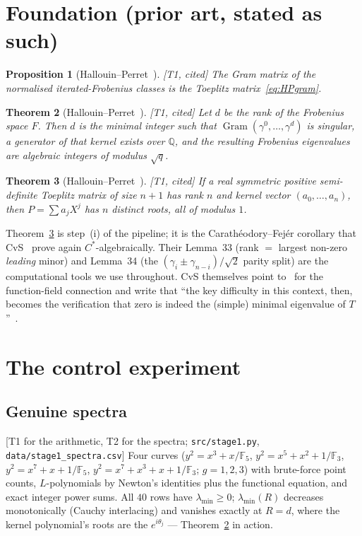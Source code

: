 \documentclass[11pt,a4paper]{article}
\newtheorem{theorem}{Theorem}
\newtheorem{proposition}[theorem]{Proposition}
\theoremstyle{definition}
\theoremstyle{remark}
\newcommand{\tier}[1]{{\small\textsf{[#1]}}}
\newcommand{\lmin}{\lambda_{\min}}
\newcommand{\src}[1]{{\footnotesize\texttt{#1}}}
\begin{document}
\section{Foundation (prior art, stated as such)}\label{sec:found}

\begin{proposition}[Hallouin--Perret~{\cite[Prop.~5, \S1.2]{HP19}}]\label{prop:HP5}
\tier{T1, cited} The Gram matrix of the normalised iterated-Frobenius classes is the
Toeplitz matrix~\eqref{eq:HPgram}.
\end{proposition}

\begin{theorem}[Hallouin--Perret~{\cite[Thm.~6, \S1.3]{HP19}}]\label{thm:HP6}
\tier{T1, cited} Let $d$ be the rank of the Frobenius space $F$. Then $d$ is the minimal
integer such that $\operatorname{Gram}(\gamma^0,\dots,\gamma^{d})$ is singular, a generator
of that kernel exists over $\mathbb{Q}$, and the resulting Frobenius eigenvalues are
algebraic integers of modulus $\sqrt q$.
\end{theorem}

\begin{theorem}[Hallouin--Perret~{\cite[Thm.~36(ii), App.~A.2]{HP19}}]\label{thm:HP36}
\tier{T1, cited} If a real symmetric positive semi-definite Toeplitz matrix of size $n+1$
has rank $n$ and kernel vector $(a_0,\dots,a_n)$, then $P=\sum a_jX^j$ has $n$ distinct
roots, all of modulus $1$.
\end{theorem}

Theorem~\ref{thm:HP36} is step~(i) of the pipeline; it is the Carath\'eodory--Fej\'er
corollary that CvS~\cite[Cor.~1.1]{CvS} prove again $C^{*}$-algebraically. Their
Lemma~33 (rank $=$ largest non-zero \emph{leading} minor) and Lemma~34 (the
$(\gamma_i\pm\gamma_{n-i})/\sqrt2$ parity split) are the computational tools we use
throughout. CvS themselves point to~\cite{HP19} for the function-field connection and
write that ``the key difficulty in this context, then, becomes the verification that zero
is indeed the (simple) minimal eigenvalue of $T$''~\cite[Introduction]{CvS}.

\section{The control experiment}\label{sec:planted}

\subsection{Genuine spectra}
\tier{T1 for the arithmetic, T2 for the spectra; \src{src/stage1.py}, \src{data/stage1\_spectra.csv}}
Four curves ($y^2=x^3+x/\mathbb{F}_5$, $y^2=x^5+x^2+1/\mathbb{F}_3$,
$y^2=x^7+x+1/\mathbb{F}_5$, $y^2=x^7+x^3+x+1/\mathbb{F}_3$; $g=1,2,3$) with brute-force
point counts, $L$-polynomials by Newton's identities plus the functional equation, and
exact integer power sums. All $40$ rows have $\lmin\ge0$; $\lmin(R)$ decreases monotonically
(Cauchy interlacing) and vanishes exactly at $R=d$, where the kernel polynomial's roots are
the $e^{i\theta_j}$ --- Theorem~\ref{thm:HP6} in action.
\end{document}
